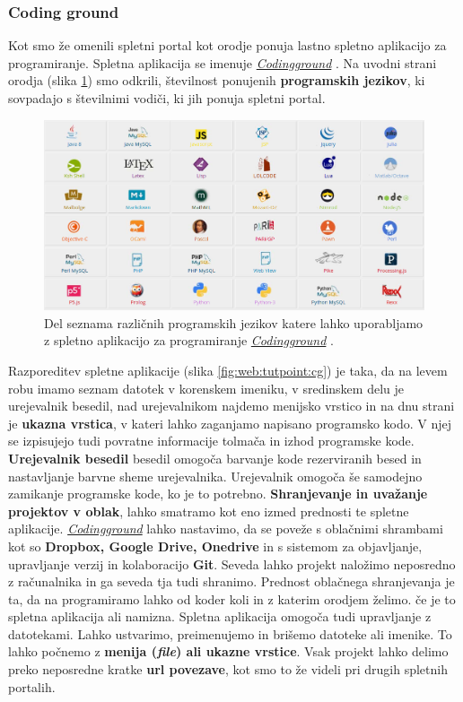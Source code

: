 \subsubsection{Coding ground}
\label{sec:coding_ground}

Kot smo že omenili spletni portal kot orodje ponuja lastno spletno
aplikacijo za programiranje. Spletna aplikacija se imenuje
\emph{\href{http://www.tutorialspoint.com/codingground.htm}{Codingground}}
\cite{web:tutorialspoint:codingground}. Na uvodni strani orodja (slika
\ref{fig:web:tutpoint:cg-pl}) smo odkrili, številnost ponujenih
\textbf{programskih jezikov}, ki sovpadajo s številnimi vodiči, ki jih
ponuja spletni portal.

\begin{figure}[h!]
  \centering
    \includegraphics [width=0.65\linewidth, keepaspectratio =
   1] {./images/sc_web/tutpoint_cg-pl-v01.png}
   \caption{Del seznama različnih programskih jezikov katere lahko
     uporabljamo z spletno aplikacijo za programiranje
     \emph{\href{http://www.tutorialspoint.com/codingground.htm}{Codingground}}
     \cite{web:tutorialspoint:codingground}.}
    \label{fig:web:tutpoint:cg-pl}
\end{figure}

Razporeditev spletne aplikacije (slika \ref{fig:web:tutpoint:cg}) je
taka, da na levem robu imamo seznam datotek v korenskem imeniku, v
sredinskem delu je urejevalnik besedil, nad urejevalnikom najdemo
menijsko vrstico in na dnu strani je \textbf{ukazna vrstica}, v kateri
lahko zaganjamo napisano programsko kodo. V njej se izpisujejo tudi
povratne informacije tolmača in izhod programske
kode. \textbf{Urejevalnik besedil} besedil omogoča barvanje kode
rezerviranih besed in nastavljanje barvne sheme
urejevalnika. Urejevalnik omogoča še samodejno zamikanje programske
kode, ko je to potrebno. \textbf{Shranjevanje in uvažanje projektov v
  oblak}, lahko smatramo kot eno izmed prednosti te spletne
aplikacije. \emph{\href{http://www.tutorialspoint.com/codingground.htm}{Codingground}}
lahko nastavimo, da se poveže s oblačnimi shrambami kot so
\textbf{Dropbox, Google Drive, Onedrive} in s sistemom za objavljanje,
upravljanje verzij in kolaboracijo \textbf{Git}. Seveda lahko projekt
naložimo neposredno z računalnika in ga seveda tja tudi
shranimo. Prednost oblačnega shranjevanja je ta, da na programiramo
lahko od koder koli in z katerim orodjem želimo. če je to spletna
aplikacija ali namizna. Spletna aplikacija omogoča tudi upravljanje z
datotekami. Lahko ustvarimo, preimenujemo in brišemo datoteke ali
imenike. To lahko počnemo z \textbf{menija (\emph{file}) ali ukazne
  vrstice}. Vsak projekt lahko delimo preko neposredne kratke
\textbf{url povezave}, kot smo to že videli pri drugih spletnih
portalih.


